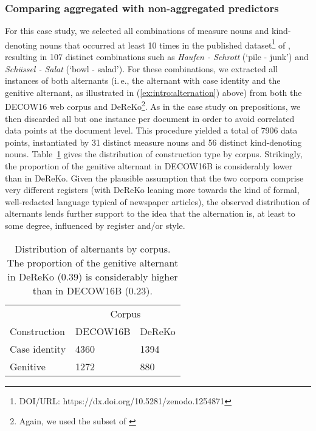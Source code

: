 \subsubsection{Comparing aggregated with non-aggregated predictors}

For this case study, we selected all combinations of measure nouns and kind-denoting nouns that occurred at least 10 times in the published dataset\footnote{DOI/URL: https://dx.doi.org/10.5281/zenodo.1254871} of \cite{Schaefer2018}, resulting in 107 distinct combinations such as \textit{Haufen - Schrott} (`pile - junk') and \textit{Schüssel - Salat} (`bowl - salad'). For these combinations, we extracted all instances of both alternants (i.\,e., the alternant with case identity and the genitive alternant, as illustrated in (\ref{ex:intro:alternation}) above) from both the DECOW16 web corpus and DeReKo\footnote{Again, we used the subset of \cite{Bubenhofer-ea2014}}. As in the case study on prepositions, we then discarded all but one instance per document in order to avoid correlated data points at the document level. This procedure yielded a total of 7906 data points, instantiated by 31 distinct measure nouns and 56 distinct kind-denoting nouns. Table~\ref{mn-dataset-summary} gives the distribution of construction type by corpus. Strikingly, the proportion of the genitive alternant in DECOW16B is considerably lower than in DeReKo. Given the plausible assumption that the two corpora comprise very different registers (with DeReKo leaning more towards the kind of formal, well-redacted language typical of newspaper articles), the observed distribution of alternants lends further support to the idea that the alternation is, at least to some degree, influenced by register and/or style.

\begin{table}
  \begin{tabular}{lll}
  \toprule
                 & \multicolumn{2}{c}{Corpus}\\
  Construction   & DECOW16B & DeReKo\\
  \midrule
  Case identity  &  4360    & 1394 \\
  Genitive       &  1272    & 880 \\
  \bottomrule
  \end{tabular}
  \caption{Distribution of alternants by corpus. The proportion of the genitive alternant in DeReKo (0.39) is considerably higher than in DECOW16B (0.23).}\label{mn-dataset-summary}  
\end{table}


